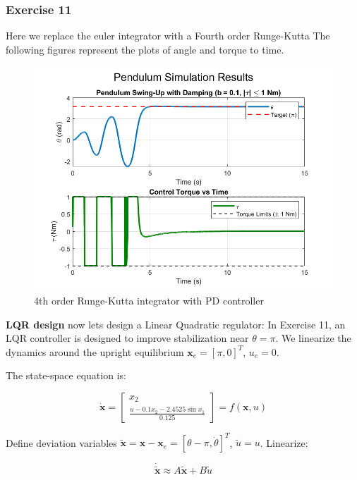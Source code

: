 \documentclass[12pt,a4paper]{article}
\begin{document}
\subsubsection*{Exercise 11}\label{sec:lqr}
Here we replace the euler integrator with a Fourth order Runge-Kutta
The following figures represent the plots of angle and torque to time.
\begin{figure}[htbp]
  \centering
  \includegraphics[width=0.9\linewidth]{../figs/rk_pd_swing_up.png}
  \caption{4th order Runge-Kutta integrator with PD controller}
  \label{fig:rk_pd_swing_up}
\end{figure}
\textbf{LQR design}
now lets design a Linear Quadratic regulator:
In Exercise 11, an LQR controller is designed to improve stabilization near \( \theta = \pi \). We linearize the dynamics around the upright equilibrium \( \mathbf{x}_e = [\pi, 0]^T \), \( u_e = 0 \).

The state-space equation is:

\begin{equation}
\dot{\mathbf{x}} = \begin{bmatrix} x_2 \\ \frac{u - 0.1 x_2 - 2.4525 \sin x_1}{0.125} \end{bmatrix} = f(\mathbf{x}, u)
\end{equation}

Define deviation variables \( \tilde{\mathbf{x}} = \mathbf{x} - \mathbf{x}_e = [\theta - \pi, \dot{\theta}]^T \), \( \tilde{u} = u \). Linearize:

\begin{equation}
\dot{\tilde{\mathbf{x}}} \approx A \tilde{\mathbf{x}} + B \tilde{u}
\end{equation}
\end{document}
